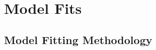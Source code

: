 \documentclass[iop]{emulateapj}
\begin{document}




%

\section{Model Fits}\label{sec:modelfits}

\subsection{Model Fitting Methodology}\label{sec:modelfitsmeth}
\end{document}
